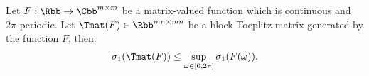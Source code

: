 \begin{theorem} \label{theorem:block_teoplitz_sup_singular}
  Let $F: \Rbb \rightarrow \Cbb^{m \times m}$ be a matrix-valued function which is continuous and $2 \pi$-periodic.
  Let $\Tmat(F) \in \Rbb^{mn \times mn}$ be a block Toeplitz matrix generated by the function $F$, then:
  \begin{align}
    \sigma_1 \left( \Tmat(F) \right) \leq \sup_{\omega \in [0, 2\pi]} \sigma_1 \left( F\left( \omega \right) \right) .
  \end{align}
  \removespace
\end{theorem}







%


